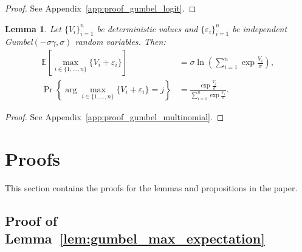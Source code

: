 \documentclass[12pt]{article}
\theoremstyle{plain}
\newtheorem{lemma}{Lemma}
\begin{document}
\begin{proof}
	See Appendix~\ref{app:proof_gumbel_logit}.
\end{proof}

\begin{lemma}
	\label{lem:gumbel_multinomial}
	Let $\{V_i\}_{i=1}^n$ be deterministic values and $\{\varepsilon_i\}_{i=1}^n$ be independent Gumbel$(-\sigma\gamma, \sigma)$ random variables. Then:
	\begin{align}
		\mathbb{E}\left[\max_{i \in \{1,\ldots,n\}} \{V_i + \varepsilon_i\}\right]    & = \sigma \ln\left( \sum_{i=1}^n \exp\frac{V_i}{\sigma} \right),       \\
		\Pr\left\{\arg\max_{i \in \{1,\ldots,n\}} \{V_i + \varepsilon_i\} = j\right\} & = \frac{\exp\frac{V_j}{\sigma}}{\sum_{i=1}^n \exp\frac{V_i}{\sigma}}.
	\end{align}
\end{lemma}

\begin{proof}
	See Appendix~\ref{app:proof_gumbel_multinomial}.
\end{proof}

\section{Proofs}\label{app:proofs}
This section contains the proofs for the lemmas and propositions in the paper.

\subsection{Proof of Lemma~\ref{lem:gumbel_max_expectation}}\label{app:proof_gumbel_max_expectation}
\end{document}
